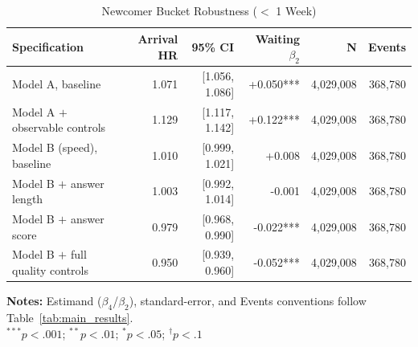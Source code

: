 \begin{table}[H]
\caption{Newcomer Bucket Robustness ($<$ 1 Week)}
\label{tab:newcomer_robustness}
\centering
\footnotesize
\begin{tabular}{@{}lrrrrr@{}}
\toprule
\textbf{Specification} & \textbf{Arrival HR} & \textbf{95\% CI} & \textbf{Waiting $\beta_2$} & \textbf{N} & \textbf{Events} \\
\midrule
Model A, baseline & 1.071 & [1.056, 1.086] & +0.050*** & 4,029,008 & 368,780 \\
Model A $+$ observable controls & 1.129 & [1.117, 1.142] & +0.122*** & 4,029,008 & 368,780 \\
Model B (speed), baseline & 1.010 & [0.999, 1.021] & +0.008 & 4,029,008 & 368,780 \\
Model B $+$ answer length & 1.003 & [0.992, 1.014] & -0.001 & 4,029,008 & 368,780 \\
Model B $+$ answer score & 0.979 & [0.968, 0.990] & -0.022*** & 4,029,008 & 368,780 \\
Model B $+$ full quality controls & 0.950 & [0.939, 0.960] & -0.052*** & 4,029,008 & 368,780 \\
\bottomrule
\end{tabular}
\vspace{0.35em}
\begin{minipage}{\linewidth}
\footnotesize
\raggedright
\textbf{Notes:} Estimand ($\beta_4$/$\beta_2$), standard-error, and Events conventions follow Table~\ref{tab:main_results}.\\
$^{***}p<.001$; $^{**}p<.01$; $^{*}p<.05$; $^{\dagger}p<.1$
\end{minipage}
\end{table}